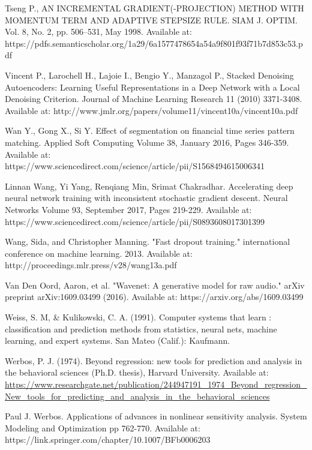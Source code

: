 \documentclass[a4paper,latin]{paper}
\begin{document}
\begin{thebibliography}{9}
Tseng P., AN INCREMENTAL GRADIENT(-PROJECTION) METHOD
WITH MOMENTUM TERM AND ADAPTIVE STEPSIZE RULE. SIAM J. OPTIM.  Vol. 8, No. 2, pp. 506–531, May 
1998. Available at: https://pdfs.semanticscholar.org/1a29/6a1577478654a54a9f801f93f71b7d853c53.pdf

Vincent P., Larochell H., Lajoie I., Bengio Y., Manzagol P., Stacked Denoising Autoencoders: Learning Useful Representations in
a Deep Network with a Local Denoising Criterion. Journal of Machine Learning Research 11 (2010) 
3371-3408. Available at: http://www.jmlr.org/papers/volume11/vincent10a/vincent10a.pdf

Wan Y., Gong X., Si Y. Effect of segmentation on financial time series pattern 
matching. Applied Soft Computing Volume 38, January 2016, Pages 346-359. 
Available at: https://www.sciencedirect.com/science/article/pii/S1568494615006341

Linnan Wang,  Yi Yang, Renqiang Min, Srimat Chakradhar. Accelerating deep neural network training with 
inconsistent stochastic gradient descent. Neural Networks
Volume 93, September 2017, Pages 219-229. Available at: https://www.sciencedirect.com/science/article/pii/S0893608017301399

Wang, Sida, and Christopher Manning. "Fast dropout training." international conference on machine learning. 2013.
Available at: http://proceedings.mlr.press/v28/wang13a.pdf

Van Den Oord, Aaron, et al. "Wavenet: A generative model for raw audio." arXiv preprint arXiv:1609.03499 (2016).
Available at: https://arxiv.org/abs/1609.03499

Weiss, S. M, \& Kulikowski, C. A. (1991). Computer systems that learn : classification and prediction methods from statistics, neural nets, machine learning, and expert systems. San Mateo (Calif.): Kaufmann.

Werbos, P. J. (1974). Beyond regression: new tools for prediction and analysis in the behavioral sciences (Ph.D. thesis), Harvard 
University. Available at: \url{https://www.researchgate.net/publication/244947191_1974_Beyond_regression_New_tools_for_predicting_and_analysis_in_the_behavioral_sciences}

Paul J. Werbos. Applications of advances in nonlinear sensitivity analysis. 
System Modeling and Optimization pp 762-770. Available at: https://link.springer.com/chapter/10.1007/BFb0006203


\end{thebibliography}
\end{document}
